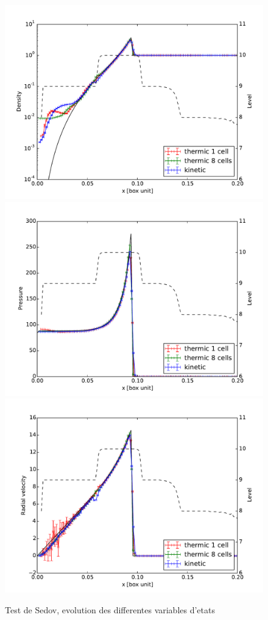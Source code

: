 \begin{figure}[bth]
        \includegraphics[width=.95\linewidth]{img/03/sedov/sedov_comp_profile_den.pdf} 
		\includegraphics[width=.95\linewidth]{img/03/sedov/sedov_comp_profile_pres.pdf} 
		\includegraphics[width=.95\linewidth]{img/03/sedov/sedov_comp_profile_vel.pdf} 
        \caption{Test de Sedov, evolution des differentes variables d'etats}
 		\label{fig:}
\end{figure}


